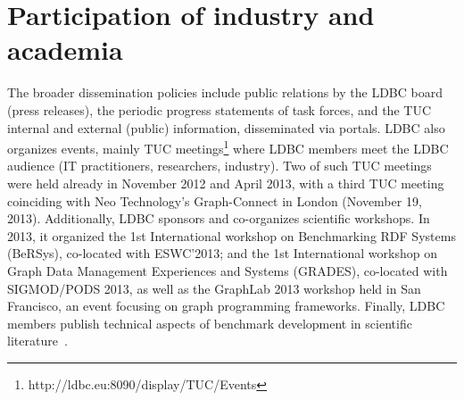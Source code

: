 

\section{Participation of industry and academia}


The broader dissemination policies include public relations by the LDBC
board (\eg press releases), the periodic progress
statements of task forces, and the TUC internal
and external (public) information, disseminated via
portals. LDBC also organizes events, mainly TUC
meetings\footnote{http://ldbc.eu:8090/display/TUC/Events}
where LDBC members meet the LDBC
audience (IT practitioners, researchers, industry).
Two of such TUC meetings were held already in
November 2012 and April 2013, with a third TUC
meeting coinciding with Neo Technology's Graph-Connect in London (November 19, 2013).
Additionally, LDBC sponsors and co-organizes scientific
workshops. In 2013, it organized the 1st International
workshop on Benchmarking RDF Systems
(BeRSys), co-located with ESWC'2013; and the 1st
International workshop on Graph Data Management
Experiences and Systems (GRADES), co-located with
SIGMOD/PODS 2013, as well as the GraphLab
2013 workshop held in San Francisco, an event
focusing on graph programming frameworks. Finally,
LDBC members publish technical aspects of benchmark
development in scientific literature~\cite{angles2013benchmarking,boncz2013tpch,cattuto2013time,gubichev2013sparqling}.





